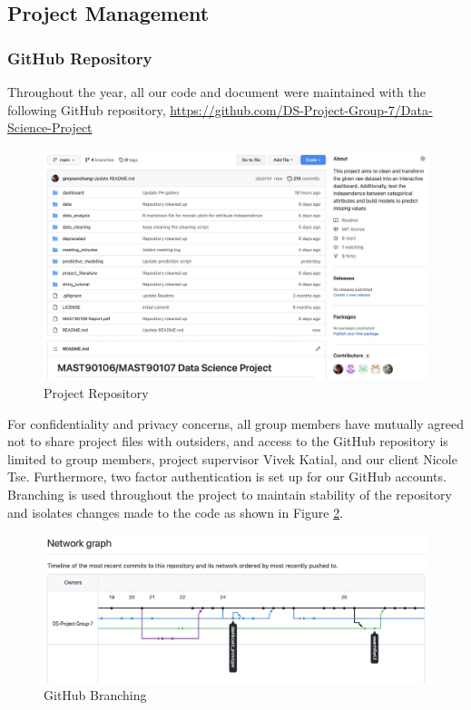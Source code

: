 \documentclass[11pt, oneside]{article}
\begin{document}
\newpage
\subsection{Project Management}
\subsubsection{GitHub Repository}
Throughout the year, all our code and document were maintained with the following GitHub repository, \newline
\url{https://github.com/DS-Project-Group-7/Data-Science-Project}

\begin{figure}[H]
    \centering
    \includegraphics[scale=0.22]{images/github-repo.jpeg}
    \caption{Project Repository}
    \label{github-repo}
\end{figure}

\noindent For confidentiality and privacy concerns, all group members have mutually agreed not to share project files with outsiders, and access to the GitHub repository is limited to group members, project supervisor Vivek Katial, and our client Nicole Tse. Furthermore, two factor authentication is set up for our GitHub accounts.
\bigbreak
\noindent Branching is used throughout the project to maintain stability of the repository and isolates changes made to the code as shown in Figure \ref{github-branching}.

\begin{figure}[H]
    \centering
    \includegraphics[scale=0.46]{images/branching.png}
    \caption{GitHub Branching}
    \label{github-branching}
\end{figure}
\end{document}
